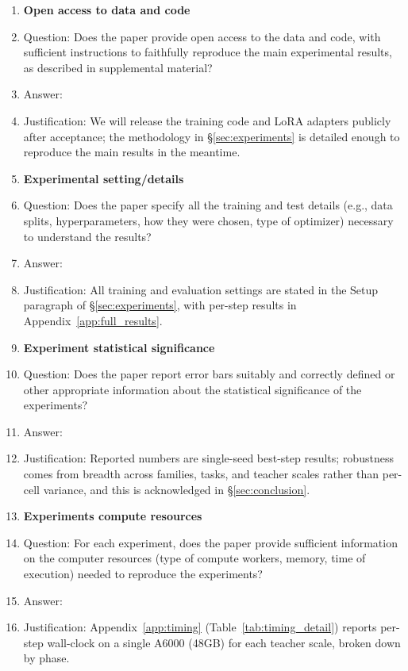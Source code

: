 \begin{enumerate}
\item {\bf Open access to data and code}
    \item[] Question: Does the paper provide open access to the data and code, with sufficient instructions to faithfully reproduce the main experimental results, as described in supplemental material?
    \item[] Answer: \answerNo{}
    \item[] Justification: We will release the training code and LoRA adapters publicly after acceptance; the methodology in \S\ref{sec:experiments} is detailed enough to reproduce the main results in the meantime.

\item {\bf Experimental setting/details}
    \item[] Question: Does the paper specify all the training and test details (e.g., data splits, hyperparameters, how they were chosen, type of optimizer) necessary to understand the results?
    \item[] Answer: \answerYes{}
    \item[] Justification: All training and evaluation settings are stated in the Setup paragraph of \S\ref{sec:experiments}, with per-step results in Appendix~\ref{app:full_results}.

\item {\bf Experiment statistical significance}
    \item[] Question: Does the paper report error bars suitably and correctly defined or other appropriate information about the statistical significance of the experiments?
    \item[] Answer: \answerNo{}
    \item[] Justification: Reported numbers are single-seed best-step results; robustness comes from breadth across families, tasks, and teacher scales rather than per-cell variance, and this is acknowledged in \S\ref{sec:conclusion}.

\item {\bf Experiments compute resources}
    \item[] Question: For each experiment, does the paper provide sufficient information on the computer resources (type of compute workers, memory, time of execution) needed to reproduce the experiments?
    \item[] Answer: \answerYes{}
    \item[] Justification: Appendix~\ref{app:timing} (Table~\ref{tab:timing_detail}) reports per-step wall-clock on a single A6000 (48GB) for each teacher scale, broken down by phase.


\end{enumerate}
